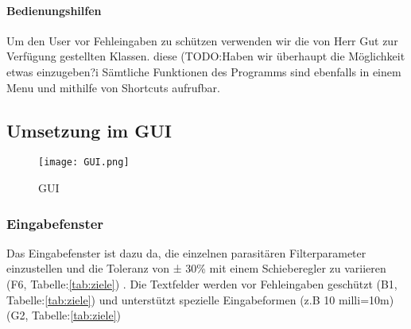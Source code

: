 \paragraph{Bedienungshilfen}\label{para:bedienungshilfen}
		Um den User vor Fehleingaben zu schützen verwenden wir die von Herr Gut zur Verfügung gestellten Klassen. diese (TODO:Haben wir überhaupt die Möglichkeit etwas einzugeben?^^)
		Sämtliche Funktionen des Programms sind ebenfalls in einem Menu und mithilfe von Shortcuts aufrufbar.





\subsection{Umsetzung im GUI}\label{subsec:umsetzungimgui}

\begin{figure}[H]
	\centering
	\texttt{[image: GUI.png]}
	\caption{GUI}
	\label{fig:GUI}
\end{figure}

\subsubsection{Eingabefenster} \label{subsubsec:eingabefenster}

Das Eingabefenster ist dazu da, die einzelnen parasitären Filterparameter einzustellen und die Toleranz von ± 30\% mit einem Schieberegler zu variieren (F6, Tabelle:\ref{tab:ziele}) . Die  Textfelder werden vor Fehleingaben geschützt (B1, Tabelle:\ref{tab:ziele}) und unterstützt spezielle Eingabeformen (z.B 10 milli=10m) (G2, Tabelle:\ref{tab:ziele})

